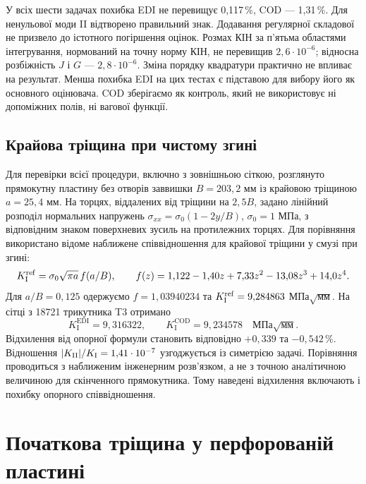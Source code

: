 У всіх шести задачах похибка EDI не перевищує 0,117\,\%, COD --- 1,31\,\%. Для ненульової моди II відтворено правильний знак. Додавання регулярної складової не призвело до істотного погіршення оцінок. Розмах КІН за п'ятьма областями інтегрування, нормований на точну норму КІН, не перевищив $2{,}6\cdot10^{-6}$; відносна розбіжність $J$ і $G$ --- $2{,}8\cdot10^{-6}$. Зміна порядку квадратури практично не впливає на результат. Менша похибка EDI на цих тестах є підставою для вибору його як основного оцінювача. COD зберігаємо як контроль, який не використовує ні допоміжних полів, ні вагової функції.

\subsection{Крайова тріщина при чистому згині}

Для перевірки всієї процедури, включно з зовнішньою сіткою, розглянуто прямокутну пластину без отворів заввишки $B=203{,}2$ мм із крайовою тріщиною $a=25{,}4$ мм. На торцях, віддалених від тріщини на $2{,}5B$, задано лінійний розподіл нормальних напружень $\sigma_{xx}=\sigma_0(1-2y/B)$, $\sigma_0=1$ МПа, з відповідним знаком поверхневих зусиль на протилежних торцях. Для порівняння використано відоме наближене співвідношення для крайової тріщини у смузі при згині:
\begin{equation}
 K_{\mathrm{I}}^{\mathrm{ref}}=\sigma_0\sqrt{\pi a}\,f(a/B),\qquad
 f(z)=1{,}122-1{,}40z+7{,}33z^2-13{,}08z^3+14{,}0z^4.
 \label{eq:ver-bending}
\end{equation}
Для $a/B=0{,}125$ одержуємо $f=1{,}03940234$ та $K_{\mathrm{I}}^{\mathrm{ref}}=9{,}284863$ МПа$\sqrt{\text{мм}}$. На сітці з 18721 трикутника T3 отримано
\begin{equation}
 K_{\mathrm I}^{\mathrm{EDI}}=9{,}316322,\qquad
 K_{\mathrm I}^{\mathrm{COD}}=9{,}234578
 \quad \text{МПа}\sqrt{\text{мм}}.
\end{equation}
Відхилення від опорної формули становить відповідно $+0{,}339$ та $-0{,}542$\,\%. Відношення $|K_{\mathrm{II}}|/K_{\mathrm{I}}=1{,}41\cdot10^{-7}$ узгоджується із симетрією задачі. Порівняння проводиться з наближеним інженерним розв'язком, а не з точною аналітичною величиною для скінченного прямокутника. Тому наведені відхилення включають і похибку опорного співвідношення.

\section{Початкова тріщина у перфорованій пластині}
\label{sec:ver-s0}


